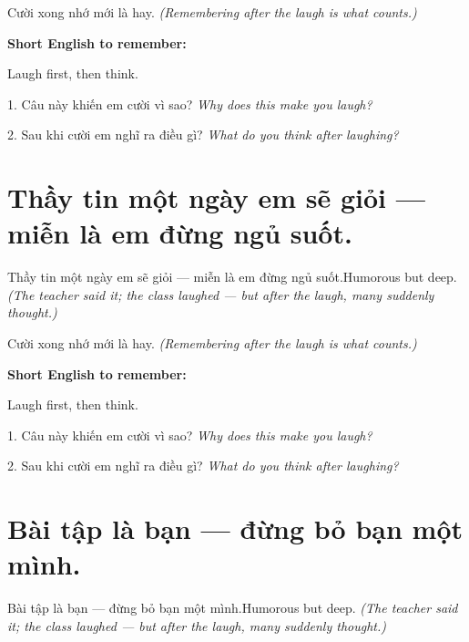 \begin{baihoc}
Cười xong nhớ mới là hay.
\textit{(Remembering after the laugh is what counts.)}
\end{baihoc}

\begin{ghinhoanh}
\textbf{Short English to remember:}

Laugh first, then think.

\end{ghinhoanh}

\begin{tuhocnhanh}
1. Câu này khiến em cười vì sao? \textit{Why does this make you laugh?}

2. Sau khi cười em nghĩ ra điều gì? \textit{What do you think after laughing?}
\end{tuhocnhanh}
\ngancach


\section{Thầy tin một ngày em sẽ giỏi — miễn là em đừng ngủ suốt.}
\begin{truyen}{Thầy tin một ngày em sẽ giỏi — miễn là em đừng ngủ suốt.}{Humorous but deep.}
\textit{(The teacher said it; the class laughed — but after the laugh, many suddenly thought.)}
\end{truyen}

\begin{baihoc}
Cười xong nhớ mới là hay.
\textit{(Remembering after the laugh is what counts.)}
\end{baihoc}

\begin{ghinhoanh}
\textbf{Short English to remember:}

Laugh first, then think.

\end{ghinhoanh}

\begin{tuhocnhanh}
1. Câu này khiến em cười vì sao? \textit{Why does this make you laugh?}

2. Sau khi cười em nghĩ ra điều gì? \textit{What do you think after laughing?}
\end{tuhocnhanh}
\ngancach


\section{Bài tập là bạn — đừng bỏ bạn một mình.}
\begin{truyen}{Bài tập là bạn — đừng bỏ bạn một mình.}{Humorous but deep.}
\textit{(The teacher said it; the class laughed — but after the laugh, many suddenly thought.)}
\end{truyen}

